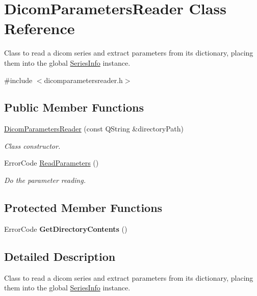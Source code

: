 \hypertarget{class_dicom_parameters_reader}{}\section{Dicom\+Parameters\+Reader Class Reference}
\label{class_dicom_parameters_reader}


Class to read a dicom series and extract parameters from its dictionary, placing them into the global \hyperlink{class_series_info}{Series\+Info} instance.  




{\ttfamily \#include $<$dicomparametersreader.\+h$>$}

\subsection*{Public Member Functions}
\begin{DoxyCompactItemize}
\item 
\hyperlink{class_dicom_parameters_reader_a5d2aff3c73d3ccd3cce88dd4bec78615}{Dicom\+Parameters\+Reader} (const Q\+String \&directory\+Path)
\begin{DoxyCompactList}\small\item\em Class constructor. \end{DoxyCompactList}\item 
Error\+Code \hyperlink{class_dicom_parameters_reader_a7f324d9d7f529d513148bed8dc85691a}{Read\+Parameters} ()
\begin{DoxyCompactList}\small\item\em Do the parameter reading. \end{DoxyCompactList}\end{DoxyCompactItemize}
\subsection*{Protected Member Functions}
\begin{DoxyCompactItemize}
\item 
\mbox{\label{class_dicom_parameters_reader_ae8d2cebcb2193bb24c7f4bb29ee6fcdd}} 
Error\+Code {\bfseries Get\+Directory\+Contents} ()
\end{DoxyCompactItemize}


\subsection{Detailed Description}
Class to read a dicom series and extract parameters from its dictionary, placing them into the global \hyperlink{class_series_info}{Series\+Info} instance. 

